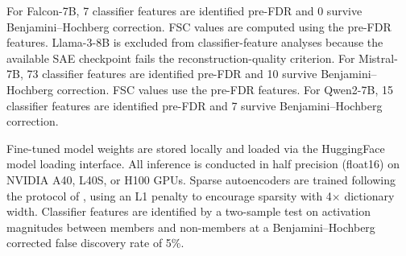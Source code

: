 \begin{table}[!htbp]
\centering
\caption{Models, fine-tuning configurations, and sparse autoencoder specifications.
All fine-tuning uses the AdamW optimizer with a cosine learning rate schedule and a maximum learning rate of $2 \times 10^{-5}$.}
\label{tab:model_details}
\end{table}

For Falcon-7B, 7 classifier features are identified pre-FDR and 0 survive Benjamini--Hochberg correction. FSC values are computed using the pre-FDR features.
Llama-3-8B is excluded from classifier-feature analyses because the available SAE checkpoint fails the reconstruction-quality criterion.
For Mistral-7B, 73 classifier features are identified pre-FDR and 10 survive Benjamini--Hochberg correction. FSC values use the pre-FDR features.
For Qwen2-7B, 15 classifier features are identified pre-FDR and 7 survive Benjamini--Hochberg correction.

Fine-tuned model weights are stored locally and loaded via the HuggingFace model loading interface.
All inference is conducted in half precision (float16) on NVIDIA A40, L40S, or H100 GPUs.
Sparse autoencoders are trained following the protocol of \citet{templeton2024scaling}, using an L1 penalty to encourage sparsity with 4$\times$ dictionary width.
Classifier features are identified by a two-sample test on activation magnitudes between members and non-members at a Benjamini--Hochberg corrected false discovery rate of 5\%.

